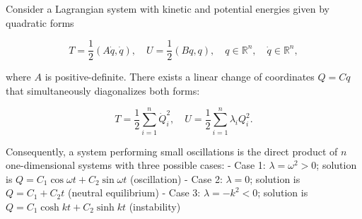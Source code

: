 Consider a Lagrangian system with kinetic and potential energies given by quadratic forms

$$T = \frac{1}{2}(A \dot{q}, \dot{q}), \quad U = \frac{1}{2}(B q, q), \quad q \in \mathbb{R}^n, \quad \dot{q} \in \mathbb{R}^n,$$

where $A$ is positive-definite. There exists a linear change of coordinates $Q = C q$ that simultaneously diagonalizes both forms:

$$T = \frac{1}{2} \sum_{i=1}^{n} \dot{Q}_i^2, \quad U = \frac{1}{2} \sum_{i=1}^{n} \lambda_i Q_i^2.$$

Consequently, a system performing small oscillations is the direct product of $n$ one-dimensional systems with three possible cases:
- Case 1: $\lambda = \omega^2 > 0$; solution is $Q = C_1 \cos \omega t + C_2 \sin \omega t$ (oscillation)
- Case 2: $\lambda = 0$; solution is $Q = C_1 + C_2 t$ (neutral equilibrium)
- Case 3: $\lambda = -k^2 < 0$; solution is $Q = C_1 \cosh kt + C_2 \sinh kt$ (instability)
